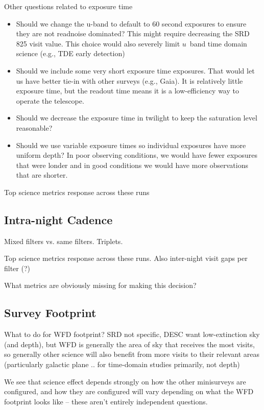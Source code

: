 Other questions related to exposure time
\begin{itemize}
    \item{Should we change the u-band to default to 60 second exposures to ensure they are not readnoise dominated? This might require decreasing the SRD 825 visit value. This choice would also severely limit $u$\ band time domain science (e.g., TDE early detection)}
    \item{Should we include some very short exposure time exposures. That would let us have better tie-in with other surveys (e.g., Gaia).  It is relatively little exposure time, but the readout time means it is a low-efficiency way to operate the telescope.}
    \item{Should we decrease the exposure time in twilight to keep the saturation level reasonable?}
    \item{Should we use variable exposure times so individual exposures have more uniform depth? In poor observing conditions, we would have fewer exposures that were londer and in good conditions we would have more observations that are shorter.}
\end{itemize}

Top science metrics response across these runs 

\subsection{Intra-night Cadence}\label{sec:intranight}

Mixed filters vs. same filters. Triplets.

Top science metrics response across these runs.
Also inter-night visit gaps per filter (?)

What metrics are obviously missing for making this decision? 

\subsection{Survey Footprint}\label{sec:bigfootprints}

What to do for WFD footprint? SRD not specific, DESC want low-extinction sky (and depth), but WFD is generally the area of sky that receives the most visits, so generally other science will also benefit from more visits to their relevant areas (particularly galactic plane .. for time-domain studies primarily, not depth)

We see that science effect depends strongly on how the other minisurveys are configured, and how they are configured will vary depending on what the WFD footprint looks like -- these aren't entirely independent questions. 

